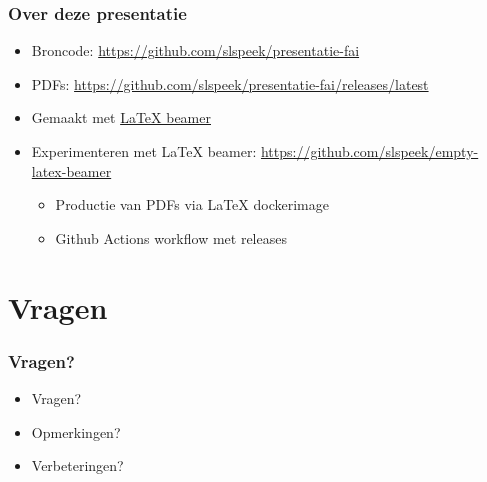 \documentclass{beamer}
\begin{document}
\begin{frame}
\frametitle{Over deze presentatie}
\begin{itemize}
  \item Broncode: \url{https://github.com/slspeek/presentatie-fai}
  \item PDFs: \url{https://github.com/slspeek/presentatie-fai/releases/latest}
  \item Gemaakt met \href{https://nl.mirrors.cicku.me/ctan/macros/latex/contrib/beamer/doc/beameruserguide.pdf}{\LaTeX{} beamer}
  \item Experimenteren met \LaTeX{} beamer: \url{https://github.com/slspeek/empty-latex-beamer}
  \begin{itemize}
    \item Productie van PDFs via \LaTeX{} dockerimage
    \item Github Actions workflow met releases
  \end{itemize}
\end{itemize}
\end{frame}

\section{Vragen}
\begin{frame}
\frametitle{Vragen?}
\begin{itemize}
  \item Vragen?
  \item<2-> Opmerkingen?
  \item<3-> Verbeteringen?
\end{itemize}
\end{frame}
\end{document}
